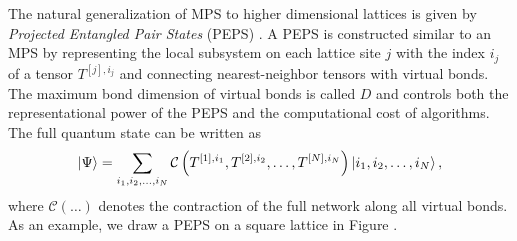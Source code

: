 The natural generalization of MPS to higher dimensional lattices is given by \textit{Projected Entangled Pair States} (PEPS) \cite{cite:algorithms_for_finite_PEPS, cite:mps_and_peps_concepts_symmetries_theorems}. A PEPS is constructed similar to an MPS by representing the local subsystem on each lattice site $j$ with the index $i_j$ of a tensor $T^{[j],i_j}$ and connecting nearest-neighbor tensors with virtual bonds. The maximum bond dimension of virtual bonds is called $D$ and controls both the representational power of the PEPS and the computational cost of algorithms. The full quantum state can be written as
\begin{equation}
	\label{eq:PEPS_definition_general}
	\ket{\Psi} = \sum_{i_1,i_2,\dots,i_N} \mathcal{C}\left(T^{[1],i_1}, T^{[2],i_2}, \dots, T^{[N],i_N}\right) \ket{i_1,i_2,\dots,i_N},
\end{equation}
where $\mathcal{C}(\dots)$ denotes the contraction of the full network along all virtual bonds. As an example, we draw a PEPS on a square lattice in Figure . \par
